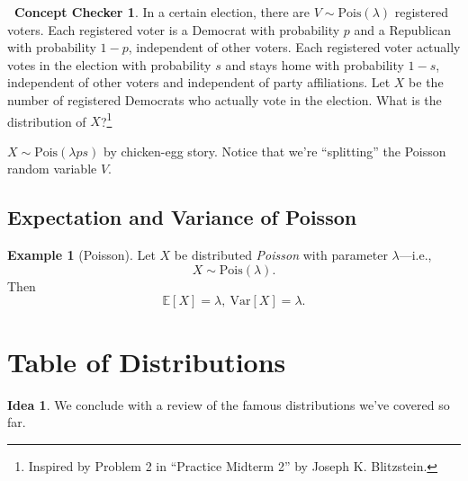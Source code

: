 \documentclass[12pt,oneside]{article}
\newcommand{\E}{\mathbb{E}}
\newcommand{\Var}{\text{Var}}
\newcommand{\Pois}{\text{Pois}}
\theoremstyle{definition}
\newtheorem{example}{Example}
\newtheorem{concept}{\faPen \ Concept Checker}
\newtheorem*{idea}{Idea}
\theoremstyle{remark}
\begin{document}
\begin{concept}
In a certain election, there are $V \sim \Pois(\lambda)$ registered voters. Each registered voter is a Democrat with probability $p$ and a Republican with probability $1 - p$, independent of other voters. Each registered voter actually votes in the election with probability $s$ and stays home with probability $1 - s$, independent of other voters and independent of party affiliations. Let $X$ be the number of registered Democrats who actually vote in the election. What is the distribution of $X$?\footnote{Inspired by Problem 2 in \enquote{Practice Midterm 2} by Joseph K. Blitzstein.}
\end{concept}

\begin{solutionbox}
$X \sim \Pois(\lambda p s)$ by chicken-egg story. Notice that we're \enquote{splitting} the Poisson random variable $V$.
\end{solutionbox}

\subsection{Expectation and Variance of Poisson}

\begin{example}[Poisson]
Let $X$ be distributed \textit{Poisson} with parameter $\lambda$—i.e., \[X \sim \Pois(\lambda).\] Then \[\E[X] = \lambda, \ \Var[X] = \lambda.\]
\end{example}

\section{Table of Distributions}

\begin{idea}
We conclude with a review of the famous distributions we've covered so far.
\end{idea}
\end{document}
